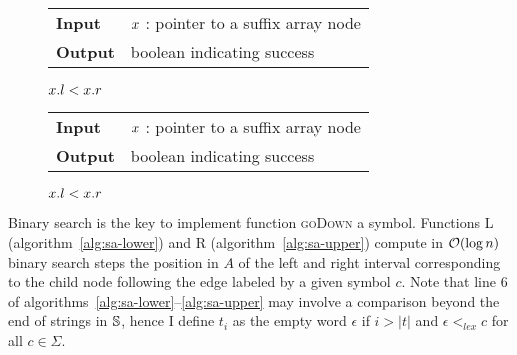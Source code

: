 \begin{figure*}[t!]
\begin{minipage}[t]{.5\textwidth}
\begin{algorithm}[H]
\begin{tabular}{ll}
\textbf{Input}  & $x$ : pointer to a suffix array node\\
\textbf{Output} & boolean indicating success\\
\end{tabular}
\begin{algorithmic}[1]
	\State \Return \False
\EndIf
{}
{}
\EndIf
\State \Return $x.l < x.r$
\end{algorithmic}
\label{alg:sa-godown}
\end{algorithm}
\end{minipage}
\hfill
\begin{minipage}[t]{.5\textwidth}
\begin{algorithm}[H]
\begin{tabular}{ll}
\textbf{Input}  & $x$ : pointer to a suffix array node\\
\textbf{Output} & boolean indicating success\\
\end{tabular}
\begin{algorithmic}[1]
	\State \Return \False
\EndIf
{}
\EndIf
\State \Return $x.l < x.r$
\item[]
\end{algorithmic}
\label{alg:sa-goright}
\end{algorithm}
\end{minipage}
\end{figure*}

Binary search is the key to implement function \textsc{goDown} a symbol.
Functions \textsc{L} (algorithm~\ref{alg:sa-lower}) and \textsc{R} (algorithm~\ref{alg:sa-upper}) compute in $\mathcal{O}(\log{n})$ binary search steps the position in $A$ of the left and right interval corresponding to the child node following the edge labeled by a given symbol $c$.
Note that line 6 of algorithms~\ref{alg:sa-lower}--\ref{alg:sa-upper} may involve a comparison beyond the end of strings in $\mathbb {S}$, hence I define $t_i$ as the empty word $\epsilon$ if $i > |t|$ and $\epsilon <_{lex} c$ for all $c \in \Sigma$.

